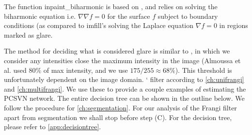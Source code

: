     The function \textrm{inpaint\_biharmonic} is based on \autocite{damelin2018surface}, and relies on solving the biharmonic equation i.e. $\nabla \nabla f = 0$
    for the surface $f$ subject to boundary conditions (as
    compared to \textrm{imfill}'s solving the Laplace equation $\nabla f = 0$ in regions marked as glare.
    
    The method for deciding what is considered glare is similar to \autocite{almoussa-ucla-reu}, in which we
    consider any intensities close the maximum intensity in the image (Almoussa et al. used $80\%$ of max intensity, and we use $175/255 \approx 68\%$). This threshold is unfortunately dependent on the image domain.
` filter according to \cref{ch:unifrangi} and \cref{ch:multifrangi}. We use these to provide a couple examples of estimating the PCSVN network. The entire decision tree can be shown in the outline below. We follow the procedure for \cref{ch:segmentation}. For our analysis of the Frangi filter apart from segmentation we shall stop before step (C). For the decision tree, please refer to \cref{app:decisiontree}.
%    
%

